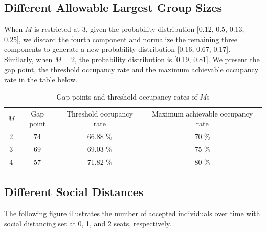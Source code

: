 \subsection*{Different Allowable Largest Group Sizes}
When $M$ is restricted at 3, given the probability distribution [0.12, 0.5, 0.13, 0.25], we discard the fourth component and normalize the remaining three components to generate a new probability distribution [0.16, 0.67, 0.17]. Similarly, when $M =2$, the probability distribution is [0.19, 0.81].
We present the gap point, the threshold occupancy rate and the maximum achievable occupancy rate in the table below.


\begin{table}[ht]
  \centering
  \caption{Gap points and threshold occupancy rates of $M$s}
  \begin{tabular}{cccc}
  \hline
   $M$  & Gap point & Threshold occupancy rate & Maximum achievable occupancy rate \\
   \cmidrule(r){1-1} \cmidrule(lr){2-2} \cmidrule(lr){3-3} \cmidrule(l){4-4}
   2 &  74  & 66.88 \% & 70 \% \\
   3 &  69  & 69.03 \% & 75 \% \\
   4 &  57  & 71.82 \% & 80 \% \\ 
   \hline
  \end{tabular}
\end{table}



\subsection*{Different Social Distances}
The following figure illustrates the number of accepted individuals over time with social distancing set at 0, 1, and 2 seats, respectively.

